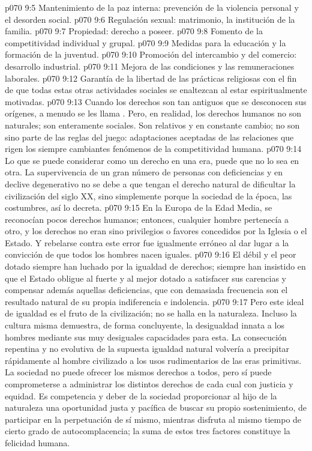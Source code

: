 \vs p070 9:5 Mantenimiento de la paz interna: prevención de la violencia personal y el desorden social.
\vs p070 9:6 Regulación sexual: matrimonio, la institución de la familia.
\vs p070 9:7 Propiedad: derecho a poseer.
\vs p070 9:8 Fomento de la competitividad individual y grupal.
\vs p070 9:9 Medidas para la educación y la formación de la juventud.
\vs p070 9:10 Promoción del intercambio y del comercio: desarrollo industrial.
\vs p070 9:11 Mejora de las condiciones y las remuneraciones laborales.
\vs p070 9:12 Garantía de la libertad de las prácticas religiosas con el fin de que todas estas otras actividades sociales se enaltezcan al estar espiritualmente motivadas.
\vs p070 9:13 \pc Cuando los derechos son tan antiguos que se desconocen sus orígenes, a menudo se les llama . Pero, en realidad, los derechos humanos no son naturales; son enteramente sociales. Son relativos y en constante cambio; no son sino parte de las reglas del juego: adaptaciones aceptadas de las relaciones que rigen los siempre cambiantes fenómenos de la competitividad humana.
\vs p070 9:14 Lo que se puede considerar como un derecho en una era, puede que no lo sea en otra. La supervivencia de un gran número de personas con deficiencias y en declive degenerativo no se debe a que tengan el derecho natural de dificultar la civilización del siglo XX, sino simplemente porque la sociedad de la época, las costumbres, así lo decreta.
\vs p070 9:15 En la Europa de la Edad Media, se reconocían pocos derechos humanos; entonces, cualquier hombre pertenecía a otro, y los derechos no eran sino privilegios o favores concedidos por la Iglesia o el Estado. Y rebelarse contra este error fue igualmente erróneo al dar lugar a la convicción de que todos los hombres nacen iguales.
\vs p070 9:16 El débil y el peor dotado siempre han luchado por la igualdad de derechos; siempre han insistido en que el Estado obligue al fuerte y al mejor dotado a satisfacer sus carencias y compensar además aquellas deficiencias, que con demasiada frecuencia son el resultado natural de su propia indiferencia e indolencia.
\vs p070 9:17 Pero este ideal de igualdad es el fruto de la civilización; no se halla en la naturaleza. Incluso la cultura misma demuestra, de forma concluyente, la desigualdad innata a los hombres mediante sus muy desiguales capacidades para esta. La consecución repentina y no evolutiva de la supuesta igualdad natural volvería a precipitar rápidamente al hombre civilizado a los usos rudimentarios de las eras primitivas. La sociedad no puede ofrecer los mismos derechos a todos, pero sí puede comprometerse a administrar los distintos derechos de cada cual con justicia y equidad. Es competencia y deber de la sociedad proporcionar al hijo de la naturaleza una oportunidad justa y pacífica de buscar su propio sostenimiento, de participar en la perpetuación de sí mismo, mientras disfruta al mismo tiempo de cierto grado de autocomplacencia; la suma de estos tres factores constituye la felicidad humana.
